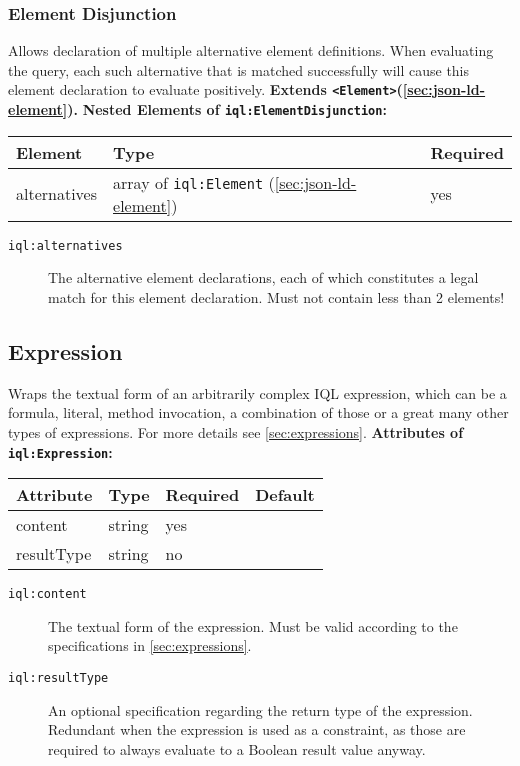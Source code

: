 \documentclass[11pt,a4paper,portrait]{article}
\newcommand{\iql}{IQL\xspace}
\newcommand{\iqlns}{iql:}
\newcommand{\iqlType}[1]{\texttt{\iqlns#1}}
\newcommand{\iqlBaseType}[1]{\texttt{\textless#1\textgreater}}
\newcommand{\desc}[1]{\noindent#1\newline\medskip}
\newcommand{\extends}[2]{\noindent\textbf{Extends #1(#2).}\newline\medskip}
\newenvironment{attributes}[1]{
\noindent\textbf{Attributes of #1:}\newline\medskip
\begin{tabular}{|p{0.3\textwidth}|p{0.20\textwidth}|p{0.20\textwidth}|p{0.17\textwidth}|}
	\hline
	\textbf{Attribute} & \textbf{Type} & \textbf{Required} & \textbf{Default} \\ 
	\hline
	\hline
}{
\end{tabular}
}
\newcommand{\attribute}[4]{
	#1 & #2 & #3 & #4 \\
	\hline
}
\newenvironment{elements}[1]{
\noindent\textbf{Nested Elements of #1:}\newline\medskip
\begin{tabular}{|p{0.3\textwidth}|p{0.42\textwidth}|p{0.17\textwidth}|}
	\hline
	\textbf{Element} & \textbf{Type} & \textbf{Required} \\ 
	\hline
	\hline
}{
\end{tabular}
}
\newcommand{\element}[3]{
#1 & #2 & #3 \\
\hline
}
\begin{document}
\subsubsection{Element Disjunction}
\label{sec:json-ld-element-disjunction}
\desc{Allows declaration of multiple alternative element definitions. When evaluating the query, each such alternative that is matched successfully will cause this element declaration to evaluate positively.}
\extends{\iqlBaseType{Element}}{\ref{sec:json-ld-element}}
\begin{elements}{\iqlType{ElementDisjunction}}
	\element{alternatives}{array of \iqlType{Element} (\ref{sec:json-ld-element})}{yes}
\end{elements}
\begin{description}
	\item[\iqlType{alternatives}] The alternative element declarations, each of which constitutes a legal match for this element declaration. Must not contain less than 2 elements!
\end{description}

\subsection{Expression}
\label{sec:json-ld-expression}
\desc{Wraps the textual form of an arbitrarily complex \iql expression, which can be a formula, literal, method invocation, a combination of those or a great many other types of expressions. For more details see \cref{sec:expressions}.}
\begin{attributes}{\iqlType{Expression}}
	\attribute{content}{string}{yes}{}
	\attribute{resultType}{string}{no}{}
\end{attributes}
\begin{description}
	\item[\iqlType{content}] The textual form of the expression. Must be valid according to the specifications in \cref{sec:expressions}.
	\item[\iqlType{resultType}] An optional specification regarding the return type of the expression. Redundant when the expression is used as a constraint, as those are required to always evaluate to a Boolean result value anyway.
\end{description}
\end{document}
